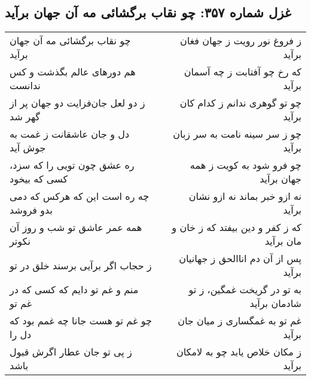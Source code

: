\begin{center}
\section*{غزل شماره ۳۵۷: چو نقاب برگشائی مه آن جهان برآید}
\label{sec:357}
\begin{longtable}{l p{0.5cm} r}
چو نقاب برگشائی مه آن جهان برآید
&&
ز فروغ نور رویت ز جهان فغان برآید
\\
هم دورهای عالم بگذشت و کس ندانست
&&
که رخ چو آفتابت ز چه آسمان برآید
\\
ز دو لعل جان‌فزایت دو جهان پر از گهر شد
&&
چو تو گوهری ندانم ز کدام کان برآید
\\
دل و جان عاشقانت ز غمت به جوش آید
&&
چو ز سر سینه نامت به سر زبان برآید
\\
ره عشق چون تویی را که سزد، کسی که بیخود
&&
چو فرو شود به کویت ز همه جهان برآید
\\
چه ره است این که هرکس که دمی بدو فروشد
&&
نه ازو خبر بماند نه ازو نشان برآید
\\
همه عمر عاشق تو شب و روز آن نکوتر
&&
که ز کفر و دین بیفتد که ز خان و مان برآید
\\
ز حجاب اگر برآیی برسند خلق در تو
&&
پس از آن دم اناالحق ز جهانیان برآید
\\
منم و غم تو دایم که کسی که در غم تو
&&
به تو در گریخت غمگین، ز تو شادمان برآید
\\
چو غم تو هست جانا چه غمم بود که دل را
&&
غم تو به غمگساری ز میان جان برآید
\\
ز پی تو جان عطار اگرش قبول باشد
&&
ز مکان خلاص یابد چو به لامکان برآید
\\
\end{longtable}
\end{center}
